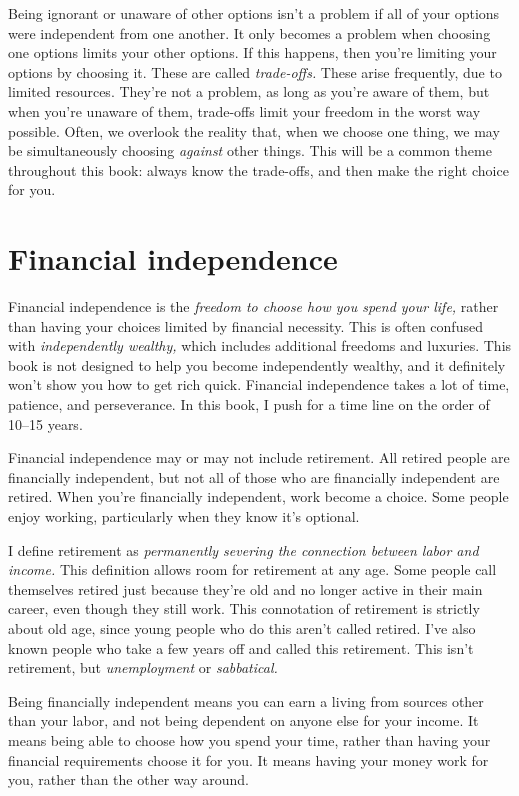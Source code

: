 Being ignorant or unaware of other options isn't a problem if all of your options were independent from one another. It only becomes a problem when choosing one options limits your other options. If this happens, then you're limiting your options by choosing it. These are called \emph{trade-offs.} These arise frequently, due to limited resources. They're not a problem, as long as you're aware of them, but when you're unaware of them, trade-offs limit your freedom in the worst way possible. Often, we overlook the reality that, when we choose one thing, we may be simultaneously choosing \emph{against} other things. This will be a common theme throughout this book: always know the trade-offs, and then make the right choice for you.

\section{Financial independence}
Financial independence is the \emph{freedom to choose how you spend your life,} rather than having your choices limited by financial necessity. This is often confused with \emph{independently wealthy,} which includes additional freedoms and luxuries. This book is not designed to help you become independently wealthy, and it definitely won't show you how to get rich quick. Financial independence takes a lot of time, patience, and perseverance. In this book, I push for a time line on the order of 10--15 years.

Financial independence may or may not include retirement. All retired people are financially independent, but not all of those who are financially independent are retired. When you're financially independent, work become a choice. Some people enjoy working, particularly when they know it's optional.

I define retirement as \emph{permanently severing the connection between labor and income.} This definition allows room for retirement at any age. Some people call themselves retired just because they're old and no longer active in their main career, even though they still work. This connotation of retirement is strictly about old age, since young people who do this aren't called retired. I've also known people who take a few years off and called this retirement. This isn't retirement, but \emph{unemployment} or \emph{sabbatical.}

Being financially independent means you can earn a living from sources other than your labor, and not being dependent on anyone else for your income. It means being able to choose how you spend your time, rather than having your financial requirements choose it for you. It means having your money work for you, rather than the other way around.


